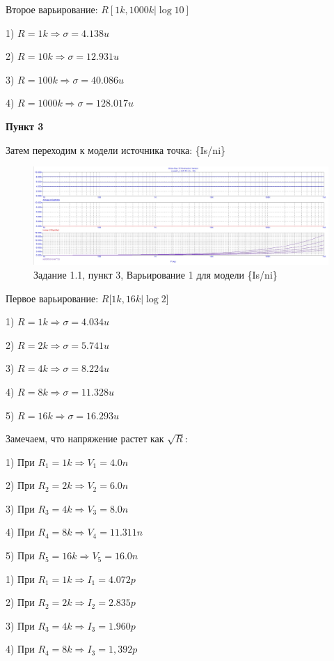 \documentclass[a4paper, 14pt]{extarticle}%
\begin{document}
Второе варьирование: $R[1k, 1000k | \log10]$

1) $R = 1k \Rightarrow \sigma = 4.138u$

2) $R = 10k \Rightarrow \sigma = 12.931u$

3) $R = 100k \Rightarrow \sigma = 40.086u$

4) $R = 1000k \Rightarrow \sigma = 128.017u$


\textbf{Пункт 3}

Затем переходим к модели источника точка: \{Is/ni\}

\begin{figure}[h!]
			\centering
			\includegraphics[width=1.1\linewidth]{pic3.jpg}
			\caption{Задание 1.1, пункт 3, Варьирование 1 для модели \{Is/ni\}}
			\label{A}
\end{figure}


Первое варьирование: $R[1k, 16k | \log2$]

1) $R = 1k \Rightarrow \sigma = 4.034u$

2) $R = 2k \Rightarrow \sigma = 5.741u$

3) $R = 4k \Rightarrow \sigma = 8.224u$

4) $R = 8k \Rightarrow \sigma = 11.328u$

5) $R = 16k \Rightarrow \sigma = 16.293u$


Замечаем, что напряжение растет как $\sqrt{R}$:

1) При $R_1 = 1k \Rightarrow  V_1 = 4.0n$

2) При $R_2 = 2k \Rightarrow  V_2 = 6.0n$

3) При $R_3 = 4k \Rightarrow  V_3 = 8.0n$

4) При $R_4 = 8k \Rightarrow  V_4 = 11.311n$

5) При $R_5 = 16k \Rightarrow  V_5 = 16.0n$

1) При $R_1 = 1k \Rightarrow  I_1 = 4.072p$

2) При $R_2 = 2k \Rightarrow  I_2 = 2.835p$

3) При $R_3 = 4k \Rightarrow  I_3 = 1.960p$

4) При $R_4 = 8k \Rightarrow  I_3 = 1,392p$
\end{document}
